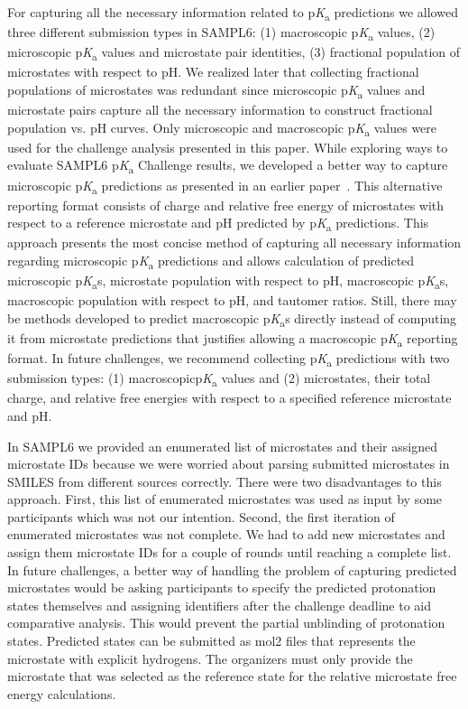 \documentclass[9pt,lineno,final]{elife}
\newcommand{\pKa}{p\textit{K}\textsubscript{a}}
\begin{document}
For capturing all the necessary information related to \pKa{} predictions we allowed three different submission types in SAMPL6: (1) macroscopic \pKa{} values, (2) microscopic \pKa{} values and microstate pair identities, (3) fractional population of microstates with respect to pH. We realized later that collecting fractional populations of microstates was redundant since microscopic \pKa{} values and microstate pairs capture all the necessary information to construct fractional population vs. pH curves.  Only microscopic and macroscopic \pKa{} values were used for the challenge analysis presented in this paper.
While exploring ways to evaluate SAMPL6 \pKa{} Challenge results, we developed a better way to capture microscopic \pKa{} predictions as presented in an earlier paper~\citep{Gunner:2020:J.Comput.AidedMol.Des.}. This alternative reporting format consists of charge and relative free energy of microstates with respect to a reference microstate and pH predicted by \pKa{} predictions. This approach presents the most concise method of capturing all necessary information regarding microscopic \pKa{} predictions and allows calculation of predicted microscopic \pKa{}s, microstate population with respect to pH, macroscopic \pKa{}s, macroscopic population with respect to pH, and tautomer ratios. 
Still, there may be methods developed to predict macroscopic \pKa{}s directly instead of computing it from microstate predictions that justifies allowing a macroscopic \pKa{} reporting format. 
In future challenges, we recommend collecting \pKa{} predictions with two submission types: (1) macroscopic\pKa{} values and (2) microstates, their total charge, and relative free energies with respect to a specified reference microstate and pH. 

In SAMPL6 we provided an enumerated list of microstates and their assigned microstate IDs because we were worried about parsing submitted microstates in SMILES from different sources correctly. There were two disadvantages to this approach. First, this list of enumerated microstates was used as input by some participants which was not our intention. Second, the first iteration of enumerated microstates was not complete. We had to add new microstates and assign them microstate IDs for a couple of rounds until reaching a complete list. In future challenges, a better way of handling the problem of capturing predicted microstates would be asking participants to specify the predicted protonation states themselves and assigning identifiers after the challenge deadline to aid comparative analysis. 
This would prevent the partial unblinding of protonation states.
Predicted states can be submitted as mol2 files that represents the microstate with explicit hydrogens. The organizers must only provide the microstate that was selected as the reference state for the relative microstate free energy calculations. 
\end{document}
